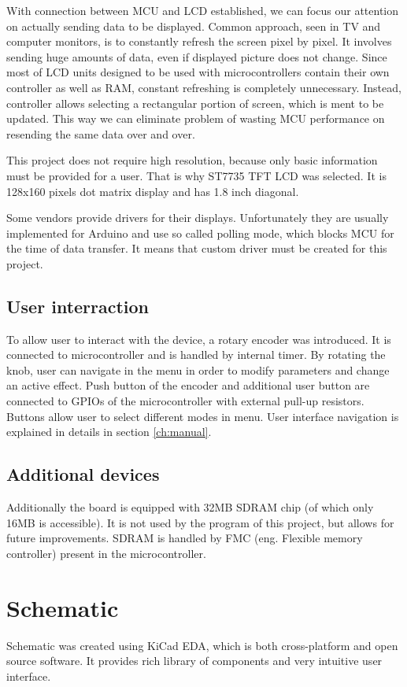 \documentclass[a4paper,twoside,12pt]{book}
\begin{document}
With connection between MCU and LCD established,
we can focus our attention on actually sending data to be displayed.
Common approach, seen in TV and computer monitors,
is to constantly refresh the screen pixel by pixel.
It involves sending huge amounts of data,
even if displayed picture does not change.
Since most of LCD units designed to be used with microcontrollers
contain their own controller as well as RAM,
constant refreshing is completely unnecessary.
Instead, controller allows selecting a rectangular portion
of screen, which is ment to be updated.
This way we can eliminate problem of wasting MCU performance
on resending the same data over and over.

This project does not require high resolution,
because only basic information must be provided for a user.
That is why ST7735 TFT LCD was selected.
It is 128x160 pixels dot matrix display
and has 1.8 inch diagonal.

Some vendors provide drivers for their displays.
Unfortunately they are usually implemented for Arduino
and use so called polling mode,
which blocks MCU for the time of data transfer.
It means that custom driver must be created for this project.

\subsection{User interraction}
To allow user to interact with the device, a rotary encoder was introduced.
It is connected to microcontroller and is handled by internal timer.
By rotating the knob, user can navigate in the menu
in order to modify parameters and change an active effect.
Push button of the encoder and additional user button are connected
to GPIOs of the microcontroller with external pull-up resistors.
Buttons allow user to select different modes in menu.
User interface navigation is explained in details
in section \ref{ch:manual}.

\subsection{Additional devices}
Additionally the board is equipped with 32MB SDRAM chip
(of which only 16MB is accessible).
It is not used by the program of this project, but allows for future improvements.
SDRAM is handled by FMC (eng. Flexible memory controller) present in the microcontroller.

\section{Schematic}
Schematic was created using KiCad EDA,
which is both cross-platform and open source software.
It provides rich library of components and very intuitive user interface.
\end{document}
